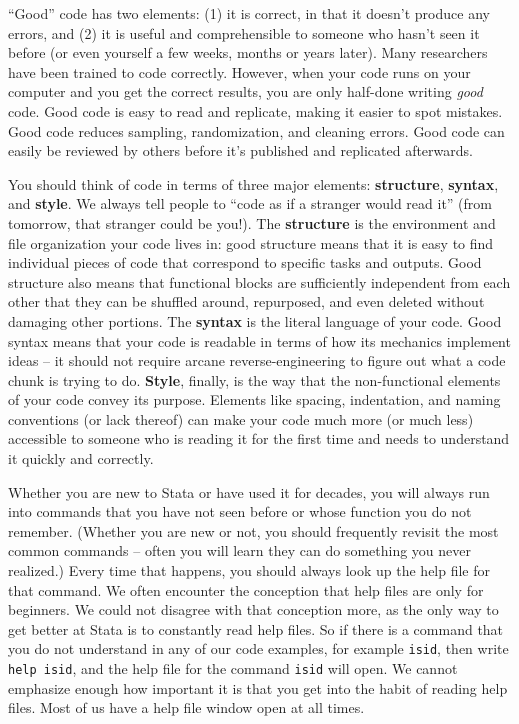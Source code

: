 ``Good'' code has two elements: (1) it is correct, in that it doesn't produce any errors,
and (2) it is useful and comprehensible to someone who hasn't seen it before
(or even yourself a few weeks, months or years later).
Many researchers have been trained to code correctly.
However, when your code runs on your computer and you get the correct results,
you are only half-done writing \textit{good} code.
Good code is easy to read and replicate, making it easier to spot mistakes.
Good code reduces sampling, randomization, and cleaning errors.
Good code can easily be reviewed by others before it's published and replicated afterwards.

You should think of code in terms of three major elements:
\textbf{structure}, \textbf{syntax}, and \textbf{style}.
We always tell people to ``code as if a stranger would read it''
(from tomorrow, that stranger could be you!).
The \textbf{structure} is the environment and file organization your code lives in:
good structure means that it is easy to find individual pieces of code
that correspond to specific tasks and outputs.
Good structure also means that functional blocks are sufficiently independent from each other
that they can be shuffled around, repurposed, and even deleted without damaging other portions.
The \textbf{syntax} is the literal language of your code.
Good syntax means that your code is readable
in terms of how its mechanics implement ideas --
it should not require arcane reverse-engineering
to figure out what a code chunk is trying to do.
\textbf{Style}, finally, is the way that the non-functional elements of your code convey its purpose.
Elements like spacing, indentation, and naming conventions (or lack thereof) can make your code much more
(or much less) accessible to someone who is reading it for the first time
and needs to understand it quickly and correctly.

Whether you are new to Stata or have used it for decades,
you will always run into commands that
you have not seen before or whose function you do not remember.
(Whether you are new or not, you should frequently revisit the most common commands --
often you will learn they can do something you never realized.)
Every time that happens,
you should always look up the help file for that command.
We often encounter the conception that help files are only for beginners.
We could not disagree with that conception more,
as the only way to get better at Stata is to constantly read help files.
So if there is a command that you do not understand in any of our code examples,
for example \texttt{isid}, then write \texttt{help isid},
and the help file for the command \texttt{isid} will open.
We cannot emphasize enough how important it is
that you get into the habit of reading help files.
Most of us have a help file window open at all times.

